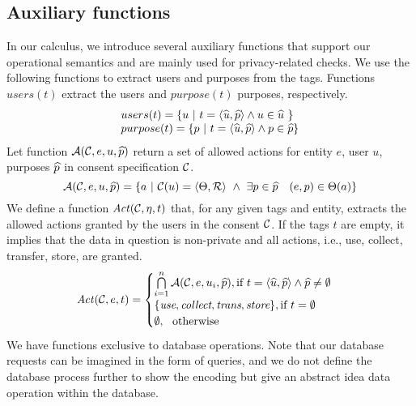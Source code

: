\subsection{Auxiliary functions}
In our calculus, we introduce several auxiliary functions that support our operational semantics and are mainly used for privacy-related checks. %
We use the following functions to extract users and purposes from the tags.  Functions $ users(t)$ extract the users and $purpose(t)$ purposes, respectively.
$$
\begin{array}{ll@{\hspace{80pt}}ll@{\hspace{30pt}}l}
 users(t) =\{u \ | \ t= \pritag \land  u \in\manyset{u} %
 \ \} \\
  purpose(t) =\{p \ | \ t= \pritag \land  p \in\manyset{p} %
  \}
 \end{array}$$
Let function $ \mathcal{A}(\mathcal{C}, e, u,\widehat{p}) $ return a set of allowed actions for entity $ e$, user $ u$, purposes $ \widehat{p} $ in consent specification $ \mathcal{C} $. 
  \[  \act(\cons,e, u,\manyset{p}) = \{ a \ | \ \cons(u) = \langle \Theta,\mathcal{R} \rangle\ \wedge\ 
 \exists
 p \in\manyset{p}\quad (e,p)\in \Theta(a) \} \]
We define a function $ \mathit{Act}(\mathcal{C},\eta, t) $ that, for any given tags and entity, extracts the allowed actions granted by the users in the consent $ \mathcal{C} $. If the tags $t$ are empty, it implies that the data in question is non-private and all actions, i.e., use, collect, transfer, store, are granted. 
 \begin{equation*}
 \at(\cons,e, t) =
  \begin{cases}
   \bigcap \limits_{i=1}^{n} {\act%
    (\cons , e, u_i, \manyset{p} )},  \text{if} \  t = \langle \manyset{u},\manyset{p} 
\rangle \land \manyset{p} \not = \emptyset  \\%
\{ \textit{use}, \textit{collect}, \textit{trans}, \textit{store} \},  \text{if}\ t = \emptyset \\
   {\mathit{\emptyset}},  \ \  \text{otherwise}
  \end{cases}
 \end{equation*}
 We have functions exclusive to database operations. Note that our database requests can be imagined in the form of queries, and we do not define the database process further to show the encoding but give an abstract idea data operation within the database. 
